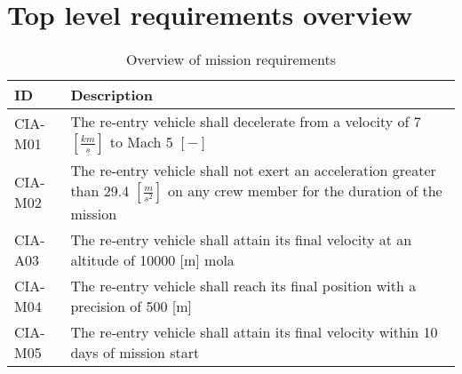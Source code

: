 \section{Top level requirements overview} \label{app:req}

\begin{table}[H]
	\caption{Overview of mission requirements} 
	\begin{tabular}{|p{}|p{}|}
    \hline
    ID          & Description                                                                                                      \\ \hline \hline
    CIA-M01& The re-entry vehicle shall decelerate from a velocity of 7 $[\frac{km}{s}]$ to Mach 5 $[-]$  \\ \hline
    CIA-M02 & The re-entry vehicle shall not exert an acceleration greater than 29.4 $[\frac{m}{s^2}]$ on any crew member for the duration of the mission			\\ \hline
    	CIA-A03 & The re-entry vehicle shall attain its final velocity at an altitude of 10000 [m] \gls{mola} \\ \hline
    	CIA-M04 & The re-entry vehicle shall reach its final position with a precision of 500 [m]\\ \hline
    	CIA-M05 & The re-entry vehicle shall attain its final velocity within 10 days of mission start \\ \hline

    \end{tabular}
\end{table}


